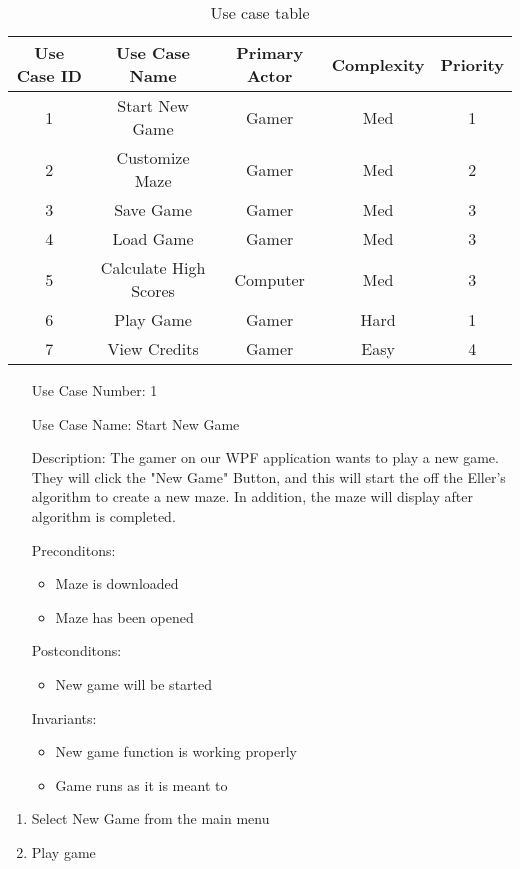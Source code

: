 \documentclass[10pt,conference,onecolumn,compsoc]{IEEEtran}
\begin{document}
\begin{table}
\centering
\begin{tabular}{|c|c|c|c|c|}
\hline
Use Case ID & Use Case Name & Primary Actor & Complexity & Priority \\
\hline \hline
1 & Start New Game & Gamer & Med & 1\\
2 & Customize Maze & Gamer & Med & 2\\
3 & Save Game & Gamer & Med & 3\\
4 & Load Game & Gamer & Med  &3\\
5 & Calculate High Scores & Computer & Med & 3\\
6 & Play Game & Gamer & Hard & 1\\
7 & View Credits & Gamer & Easy & 4\\
\hline

\end{tabular}
\caption{Use case table}
\label{tab:useCaseIndex}
\end{table}


\begin{itemize}
\item[Use Case Number:] 1
\item[Use Case Name:] Start New Game 
\item[Description:] The gamer on our WPF application wants to play a new game. They will click the "New Game" Button, and this will start the off the Eller's algorithm to create a new maze. In addition, the maze will display after algorithm is completed. 
\item[Preconditons:]
\begin{itemize} 
\item Maze is downloaded
\item Maze has been opened
\end{itemize}

\item[Postconditons:]
\begin{itemize} 
\item New game will be started
\end{itemize}
\item[Invariants:]
\begin{itemize} 
\item New game function is working properly
\item Game runs as it is meant to
\end{itemize}
\end{itemize}


\begin{enumerate}
\item Select New Game from the main menu
\item Play game
\end{enumerate}
\end{document}
